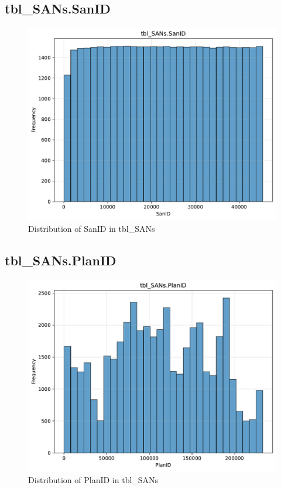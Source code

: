 \subsection{tbl\_SANs.SanID}

\begin{figure}[htbp]
\centering
\includegraphics[width=\textwidth]{figures/dbo_tbl_SANs_SanID.pdf}
\caption{Distribution of SanID in tbl\_SANs}
\end{figure}\newpage

\subsection{tbl\_SANs.PlanID}

\begin{figure}[htbp]
\centering
\includegraphics[width=\textwidth]{figures/dbo_tbl_SANs_PlanID.pdf}
\caption{Distribution of PlanID in tbl\_SANs}
\end{figure}\newpage

